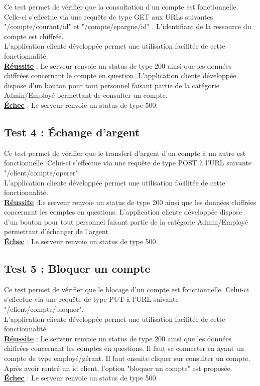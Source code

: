 Ce test permet de vérifier que la consultation d'un compte est fonctionnelle.
Celle-ci s'effectue via une requête de type GET aux URLs suivantes "/compte/courant/{id}" et "/compte/epargne/{id}" .
L'identifiant de la ressource du compte est chiffrée.
\\
L'application cliente développée permet une utilisation facilitée de cette fonctionnalité. 
\\
\textbf{\underline{Réussite}} : Le serveur renvoie un status de type 200 ainsi que les données chiffrées concernant le compte en question.
L'application cliente développée dispose d'un bouton pour tout personnel faisant partie de la catégorie Admin/Employé permettant de consulter un compte.
\\
\textbf{\underline{Échec}} : Le serveur renvoie un status de type 500.

\subsection{Test 4 : Échange d'argent}

Ce test permet de vérifier que le transfert d'argent d'un compte à un autre est fonctionnelle.
Celui-ci s'effectue via une requête de type POST à l’URL suivante "/client/compte/operer".
\\
L'application cliente développée permet une utilisation facilitée de cette fonctionnalité. 
\\
\textbf{\underline{Réussite}} :Le serveur renvoie un status de type 200 ainsi que les données chiffrées concernant les comptes en questions.
L'application cliente développée dispose d'un bouton pour tout personnel faisant partie de la catégorie Admin/Employé permettant d'échanger de l'argent.
\\
\textbf{\underline{Échec}} : Le serveur renvoie un status de type 500.

\subsection{Test 5 : Bloquer un compte}

Ce test permet de vérifier que le blocage d'un compte est fonctionnelle.
Celui-ci s'effectue via une requête de type PUT à l’URL suivante "/client/compte/bloquer".
\\
L'application cliente développée permet une utilisation facilitée de cette fonctionnalité. 
\\
\textbf{\underline{Réussite}} : Le serveur renvoie un status de type 200 ainsi que les données chiffrées concernant les comptes en questions.
Il faut se connecter en ayant un compte de type employé/gérant. Il faut ensuite cliquer sur consulter un compte. Après avoir rentré un id client, l'option "bloquer un compte" est proposée.
\\
\textbf{\underline{Échec}} :  Le serveur renvoie un status de type 500.

